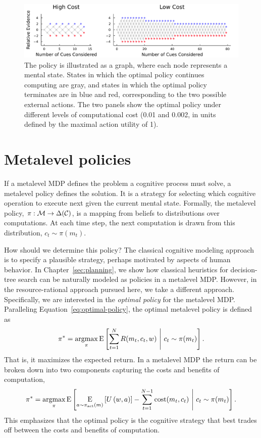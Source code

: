 \begin{figure}[tb!]
  \centering
  \includegraphics[width=\textwidth]{figs/policies.pdf}
  \caption{ The policy is illustrated as a graph, where each node represents a mental state. States in which the optimal policy continues computing are gray, and states in which the optimal policy terminates are in blue and red, corresponding to the two possible external actions. The two panels show the optimal policy under different levels of computational cost (0.01 and 0.002, in units defined by the maximal action utility of 1).
  }
  \label{fig:tally-policies}
\end{figure}

\section{Metalevel policies}\label{sec:metamdp-policy}

If a metalevel MDP defines the problem a cognitive process must solve, a metalevel policy defines the solution. It is a strategy for selecting which cognitive operation to execute next given the current mental state. Formally, the metalevel policy, $\pi: \M \rightarrow \Delta(\C)$, is a mapping from beliefs to distributions over computations. At each time step, the next computation is drawn from this distribution, $c_t \sim \pi(m_t)$.

How should we determine this policy? The classical cognitive modeling approach is to specify a plausible strategy, perhaps motivated by aspects of human behavior. In Chapter~\ref{sec:planning}, we show how classical heuristics for decision-tree search can be naturally modeled as policies in a metalevel MDP. However, in the resource-rational approach pursued here, we take a different approach. Specifically, we are interested in the \emph{optimal policy} for the metalevel MDP. Paralleling Equation~\ref{eq:optimal-policy}, the optimal metalevel policy is defined as
%
\begin{equation}\label{eq:optimal-meta-policy}
  \pi^* = \argmax_\pi \expect{
    \sum_{t=1}^{\tmax} R(m_t, c_t, w)
  }{
    c_t \sim \pi(m_t)
  }.
\end{equation}
That is, it maximizes the expected return. In a metalevel MDP the return can be broken down into two components capturing the costs and benefits of computation,
\begin{equation}
  \pi^* = \argmax_\pi \expect{
    \expectunder{U\left(w, a\right)}{a \sim \pi\act(m)} -
      \sum_{t=1}^{\tmax-1} \cost(m_t, c_t)
  }{
    c_t \sim \pi(m_t)
  }.
\end{equation}
This emphasizes that the optimal policy is the cognitive strategy that best trades off between the costs and benefits of computation.

